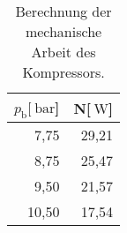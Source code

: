 
\begin{table}[!h]
\begin{center}
\begin{tabular}{|r|r|}
\hline
$p_\mathrm{b}[\SI{}{\bar}$] & N[$\SI{}{\watt}$]\\
\hline
\hline
 7,75 & 29,21\\
 8,75 & 25,47\\
 9,50 & 21,57\\
10,50 & 17,54\\
\hline
\end{tabular}
\caption[]{Berechnung der mechanische Arbeit des Kompressors.}
\label{arbeit2}
\end{center}
\end{table}